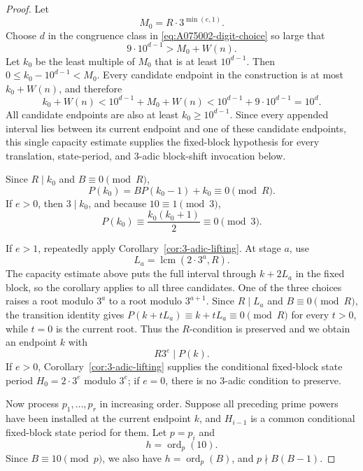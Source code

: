 \documentclass[11pt]{amsart}
\theoremstyle{remark}
\newcommand{\ord}{\operatorname{ord}}
\begin{document}
\begin{proof}
Let
\begin{equation}\label{eq:A075002-initial-modulus}
M_0=R\cdot3^{\min(e,1)}.
\end{equation}
Choose \(d\) in the congruence class in \eqref{eq:A075002-digit-choice} so large that
\begin{equation}\label{eq:A075002-capacity}
9\cdot10^{d-1}>M_0+W(n).
\end{equation}
Let \(k_0\) be the least multiple of \(M_0\) that is at least \(10^{d-1}\).  Then
\(0\le k_0-10^{d-1}<M_0\).  Every candidate endpoint in the construction is at most
\(k_0+W(n)\), and therefore
\[
k_0+W(n)
 <10^{d-1}+M_0+W(n)
 <10^{d-1}+9\cdot10^{d-1}
 =10^d.
\]
All candidate endpoints are also at least \(k_0\ge10^{d-1}\).  Since every appended
interval lies between its current endpoint and one of these candidate endpoints, this
single capacity estimate supplies the fixed-block hypothesis for every translation,
state-period, and \(3\)-adic block-shift invocation below.

Since \(R\mid k_0\) and \(B\equiv0\pmod R\),
\begin{equation}\label{eq:A075002-initial-R}
P(k_0)=BP(k_0-1)+k_0\equiv0\pmod R.
\end{equation}
If \(e>0\), then \(3\mid k_0\), and because \(10\equiv1\pmod3\),
\[
P(k_0)\equiv\frac{k_0(k_0+1)}2\equiv0\pmod3.
\]

If \(e>1\), repeatedly apply Corollary~\ref{cor:3-adic-lifting}.  At stage \(a\), use
\[
L_a=\operatorname{lcm}(2\cdot3^a,R).
\]
The capacity estimate above puts the full interval through \(k+2L_a\) in the fixed block,
so the corollary applies to all three candidates.  One of the three choices raises a root
modulo \(3^a\) to a root modulo \(3^{a+1}\).  Since \(R\mid L_a\) and \(B\equiv0\pmod R\),
the transition identity gives \(P(k+tL_a)\equiv k+tL_a\equiv0\pmod R\) for every
\(t>0\), while \(t=0\) is the current root.  Thus the \(R\)-condition is preserved and
we obtain an endpoint \(k\) with
\[
R3^e\mid P(k).
\]
If \(e>0\), Corollary~\ref{cor:3-adic-lifting} supplies the conditional fixed-block state
period \(H_0=2\cdot3^e\) modulo \(3^e\); if \(e=0\), there is no \(3\)-adic condition
to preserve.

Now process \(p_1,\ldots,p_r\) in increasing order.  Suppose all preceding prime powers have
been installed at the current endpoint \(k\), and \(H_{i-1}\) is a common conditional
fixed-block state period for them.  Let \(p=p_i\) and
\[
h=\ord_p(10).
\]
Since \(B\equiv10\pmod p\), we also have \(h=\ord_p(B)\), and
\(p\nmid B(B-1)\).


\end{proof}
\end{document}
